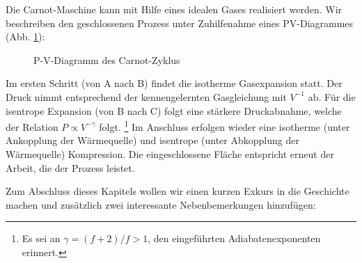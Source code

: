 Die Carnot-Maschine kann mit Hilfe eines idealen Gases realisiert werden.
Wir beschreiben den geschlossenen Prozess unter Zuhilfenahme eines PV-Diagrammes (Abb. \ref{fig:CarnotCyclePVDiagram}):
\begin{figure}[htbp]
    \centering
    \tfigPV
    \caption{P-V-Diagramm des Carnot-Zyklus}
    \label{fig:CarnotCyclePVDiagram}
\end{figure}
Im ersten Schritt (von A nach B) findet die isotherme Gasexpansion statt. Der Druck nimmt entsprechend der kennengelernten Gasgleichung mit $V^{-1}$ ab. Für die isentrope Expansion (von B nach C) folgt eine stärkere Druckabnahme, welche der Relation $P \propto V^{-\gamma}$ folgt. \footnote{Es sei an $\gamma=(f+2)/f>1$, den eingeführten Adiabatenexponenten erinnert.} Im Anschluss erfolgen wieder eine isotherme (unter Ankopplung der Wärmequelle) und isentrope (unter Abkopplung der Wärmequelle) Kompression. Die eingeschlossene Fläche entspricht erneut der Arbeit, die der Prozess leistet. 

Zum Abschluss dieses Kapitels wollen wir einen kurzen Exkurs in die Geschichte machen und zusätzlich zwei interessante Nebenbemerkungen hinzufügen: 

